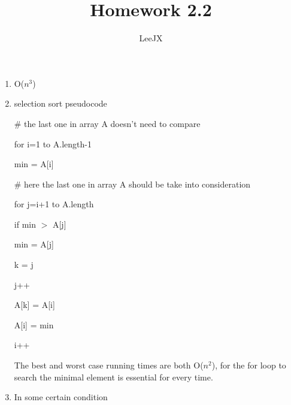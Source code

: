 \documentclass{article}
\title{Homework 2.2}
\author{LeeJX}
\begin{document}
\maketitle

\begin{enumerate}[\textbf{2.2}-1]
\item O($n^3$)
\item selection sort pseudocode
\par \# the last one in array A doesn't need to compare
\par for i=1 to A.length-1
\par \quad min = A[i]
\par \# here the last one in array A should be take into consideration
\par \quad for j=i+1 to A.length
\par \quad \quad if min $>$ A[j]
\par \quad \quad min = A[j]
\par \quad \quad k = j
\par \quad \quad j++
\par \quad A[k] = A[i]
\par \quad A[i] = min
\par \quad i++
\par The best and worst case running times are both O($n^2$), for the for loop to search the minimal element is essential for every time.
\item In some certain condition
\end{enumerate}
\end{document}
